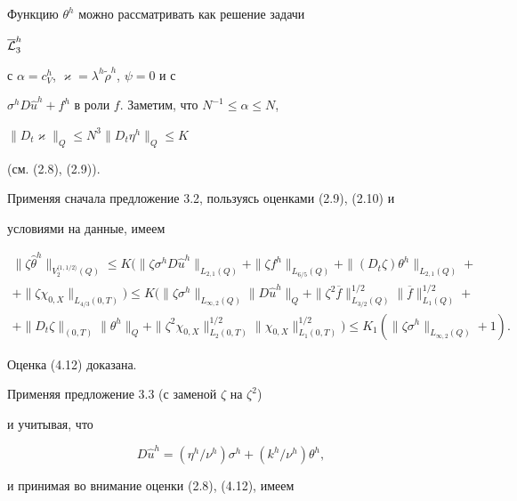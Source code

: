 Функцию $\theta^h$ можно рассматривать как решение задачи


$\overline{\cal L}_3^h$


с $\alpha=c_V^h$, $\varkappa=\lambda^h\widetilde\rho^h$, $\psi=0$ и с


$\sigma^h D\widehat u^h+f^h$ в роли $f$. Заметим, что $N^{-1}\le\alpha\le N$,


$\|D_t\varkappa\|_Q\le N^3\|D_t\eta^h\|_Q\le K$


(см. (2.8), (2.9)).


Применяя сначала предложение 3.2, пользуясь оценками (2.9), (2.10) и


условиями на данные, имеем


\begin{multline*}


\|\zeta\widehat\theta^h\|_{V_2^{\langle 1,1/2\rangle}(Q)}\le


K\big(\|\zeta\sigma^h D\widehat u^h\|_{L_{2,1}(Q)}+


\|\zeta f^h\|_{L_{6/5}(Q)}+\|(D_t\zeta)\theta^h\|_{L_{2,1}(Q)}+\\


+\|\zeta\chi_{0,X}\|_{L_{4/3}(0,T)}\big)


\le K\big(\|\zeta\sigma^h\|_{L_{\infty,2}(Q)}\|D\widehat u^h\|_Q


+\|\zeta^2\overline f\|^{1/2}_{L_{3/2}(Q)}\|\overline f\|^{1/2}_{L_1(Q)}+\\


+\|D_t\zeta\|_{(0,T)}\|\theta^h\|_Q


+\|\zeta^2\chi_{0,X}\|^{1/2}_{L_2(0,T)}\|\chi_{0,X}\|^{1/2}_{L_1(0,T)}\big)


\le K_1(\|\zeta\sigma^h\|_{L_{\infty,2}(Q)}+1).


\end{multline*}


Оценка (4.12) доказана.





Применяя предложение 3.3 (с заменой $\zeta$ на $\zeta^2$)


и учитывая, что


\begin{equation}


D\widehat u^h=(\eta^h/\nu^h)\sigma^h+(k^h/\nu^h)\theta^h,


\end{equation}


и принимая во внимание оценки (2.8), (4.12), имеем


